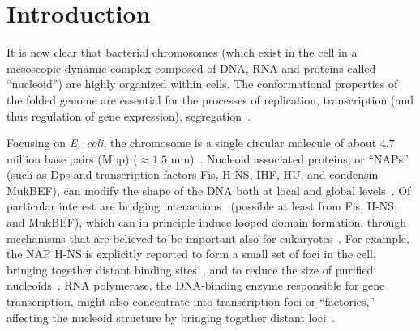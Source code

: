 \documentclass[
preprint,
a4paper,
12pt,
superscriptaddress,
pre]{revtex4}
\begin{document}
\maketitle




\section{Introduction} 

%

It is now clear that bacterial chromosomes (which exist in the cell in
a mesoscopic dynamic complex composed of DNA, RNA and proteins called
``nucleoid'') are highly organized within cells. The conformational
properties of the folded genome are essential for the processes of
replication, transcription (and thus regulation of gene expression),
segregation~\cite{Benza2012,Dillon2010,Muskhelishvili2010}.


Focusing on \emph{E.~coli}, the chromosome is a single circular
molecule of about $4.7$ million base pairs (Mbp) ($\approx1.5$
mm)~\cite{Trun1998,Stavans2006}. Nucleoid associated proteins, or
``NAPs'' (such as Dps and transcription factors Fis, H-NS, IHF, HU,
and condensin MukBEF), can modify the shape of the DNA both at local
and global levels~\cite{Dillon2010,LNW+06,Ohniwa2011}.
%
Of particular interest are bridging interactions~\cite{Wiggins2009}
(possible at least from Fis, H-NS, and MukBEF), which can in principle
induce looped domain formation, through mechanisms that are believed
to be important also for eukaryotes~\cite{Brackley2013,Barbieri2013b}.
For example, the NAP H-NS is explicitly reported to form a small set
of foci in the cell, bringing together distant binding
sites~\cite{Wang2011a}, 
and to reduce the size of purified
nucleoids~\cite{Thacker2013}.
RNA polymerase, the DNA-binding enzyme responsible for gene
transcription, might also concentrate into transcription foci or
``factories,'' affecting the nucleoid structure by bringing together
distant loci~\cite{JC06,GHH+05}.
\end{document}

